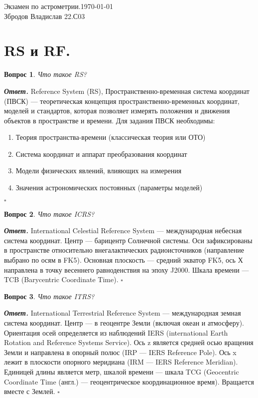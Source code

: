 \documentclass[12pt]{article}
\newtheorem{problem}{Вопрос}
\newenvironment{solution}[1][\it{Ответ}]{\textbf{#1. } }{$\square$}
\begin{document}
	\noindent Экзамен по астрометрии.\hfill \today \\
	Збродов Владислав 22.С03
	
	\hrulefill
	

\section{RS и RF.}
	\begin{problem}
		Что такое RS?
		
		
	\end{problem}

	\begin{solution}
	Reference System (RS), Пространственно-временная система координат (ПВСК) — теоретическая
	концепция пространственно-временных координат, моделей и стандартов, которая позволяет измерять положения и движения объектов в пространстве и времени.
	Для задания ПВСК необходимы:
	\begin{enumerate}
	\item Теория пространства-времени (классическая теория или ОТО)
	\item Система координат и аппарат преобразования координат
	 \item Модели физических явлений, влияющих на измерения
	\item Значения астрономических постоянных (параметры моделей)
			\end{enumerate}
	\end{solution} 
	
		\begin{problem}
		Что такое ICRS?
	\end{problem}
	\begin{solution}
		International Celestial Reference System — международная небесная система координат. Центр — барицентр Солнечной системы. Оси зафиксированы в пространстве относительно внегалактических радиоисточников (направление выбрано по осям в FK5). Основная плоскость — средний экватор FK5, ось Х направлена в точку весеннего равноденствия на эпоху J2000. Шкала времени — TCB (Barycentric Coordinate Time).
	\end{solution}
	
	\begin{problem}
		Что такое ITRS?
	\end{problem}
	
	\begin{solution}
		International Terrestrial Reference System — международная земная система координат. Центр — в геоцентре Земли (включая океан и атмосферу). Ориентация осей определяется из наблюдений IERS (international Earth Rotation and Reference Systems Service). Ось z является средней осью вращения Земли и направлена в опорный полюс (IRP — IERS Reference Pole). Ось x лежит в плоскости опорного меридиана (IRM — IERS Reference	Meridian). Единицей длины является метр, шкалой времени — шкала TCG (Geocentric	Coordinate Time (англ.) — геоцентрическое координационное время). Вращается вместе с
		Землей.
	\end{solution}
	
\end{document}

